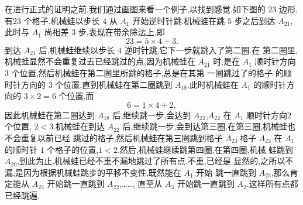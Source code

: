 \documentclass[a4paper]{article}
\begin{document}
在进行正式的证明之前,我们通过画图来看一个例子,以找到感觉.如下图的 $23$
边形,有$23$ 个格子,机械蛙以步长 $4$ 从 $A_1$ 开始逆时针跳.机械蛙在跳
$5$ 步之后到达 $A_{21}$,此时与 $A_1$ 尚相差 $3$ 步,表现在带余除法上,即
$$
23=5\times 4+3.
$$
到达 $A_{21}$ 后,机械蛙继续以步长 $4$ 逆时针跳,它下一步就跳入了第二圈.在
第二圈里,机械蛙显然不会重复过去已经跳过的点,因为机械蛙在 $A_{21}$ 时,是在
$A_1$ 顺时针方向 $3$ 个位置,然后机械蛙在第二圈里所跳的格子,总是在其第
一圈跳过了的格子
的顺时针方向的 $3$ 个位置,直到机械蛙在第二圈跳到 $A_{18}$.此时机械蛙在
$A_1$ 的顺时针方向的 $3\times 2=6$ 个位置.而
$$
6=1\times 4+2,
$$
因此机械蛙在第二圈达到 $A_{18}$ 后,继续跳一步,会达到 $A_{22}$,$A_{22}$
在 $A_1$ 顺时针方向$2$ 个位置, $2<3$.机械蛙在到达
$A_{22}$ 后,继续跳一步,会到达第三圈,在第三圈,机械蛙也不会重复以前已经
跳过的格子,然后机械蛙在第三圈跳到格子 $A_{23}$.格子 $A_{23}$ 在 $A_1$
的顺时针 $1$ 个格子的位置,$1<2$.然后,机械蛙继续跳第四圈,在第四圈,机械
蛙跳到 $A_{20}$,到此为止,机械蛙已经不重不漏地跳过了所有点.不重,已经是
显然的,之所以不漏,是因为根据机械蛙跳步的平移不变性,既然能在 $A_1$ 开始
跳一直跳到 $A_{23}$,那么肯定能从 $A_{23}$ 开始跳一直跳到 $A_{22}$,……,
直至从 $A_3$ 开始跳一直跳到 $A_2$.这样所有点都已经跳遍.
\end{document}
